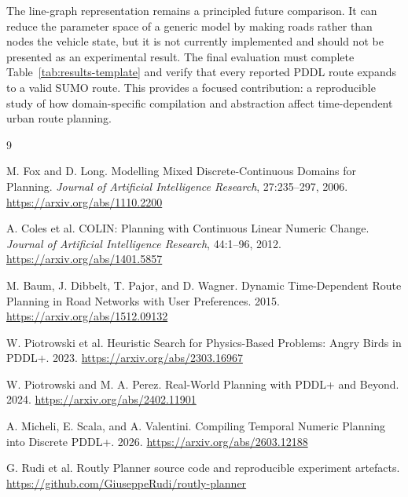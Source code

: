 \documentclass[10pt]{article}
\begin{document}
The line-graph representation remains a principled future comparison. It can
reduce the parameter space of a generic model by making roads rather than nodes
the vehicle state, but it is not currently implemented and should not be
presented as an experimental result. The final evaluation must complete
Table~\ref{tab:results-template} and verify that every reported PDDL route
expands to a valid SUMO route. This provides a focused contribution: a
reproducible study of how domain-specific compilation and abstraction affect
time-dependent urban route planning.

\begin{thebibliography}{9}

M. Fox and D. Long.
\newblock Modelling Mixed Discrete-Continuous Domains for Planning.
\newblock \emph{Journal of Artificial Intelligence Research}, 27:235--297,
2006. \url{https://arxiv.org/abs/1110.2200}

A. Coles et al.
\newblock COLIN: Planning with Continuous Linear Numeric Change.
\newblock \emph{Journal of Artificial Intelligence Research}, 44:1--96,
2012. \url{https://arxiv.org/abs/1401.5857}

M. Baum, J. Dibbelt, T. Pajor, and D. Wagner.
\newblock Dynamic Time-Dependent Route Planning in Road Networks with User
Preferences. 2015. \url{https://arxiv.org/abs/1512.09132}

W. Piotrowski et al.
\newblock Heuristic Search for Physics-Based Problems: Angry Birds in PDDL+.
2023. \url{https://arxiv.org/abs/2303.16967}

W. Piotrowski and M. A. Perez.
\newblock Real-World Planning with PDDL+ and Beyond.
2024. \url{https://arxiv.org/abs/2402.11901}

A. Micheli, E. Scala, and A. Valentini.
\newblock Compiling Temporal Numeric Planning into Discrete PDDL+.
2026. \url{https://arxiv.org/abs/2603.12188}

G. Rudi et al.
\newblock Routly Planner source code and reproducible experiment artefacts.
\url{https://github.com/GiuseppeRudi/routly-planner}

\end{thebibliography}
\end{document}
